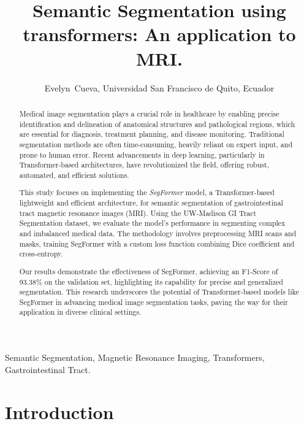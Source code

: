\documentclass[journal]{IEEEtran}
\author{}
\date{}
\begin{document}
\title{Semantic Segmentation using transformers: An application to MRI.}
\author{Evelyn~Cueva, Universidad San Francisco de Quito, Ecuador}
\newpage
\twocolumn

\fontsize{10}{12}\selectfont

\maketitle

\begin{abstract}
  Medical image segmentation plays a crucial role in healthcare by enabling precise identification and delineation of anatomical structures and pathological regions, which are essential for diagnosis, treatment planning, and disease monitoring. Traditional segmentation methods are often time-consuming, heavily reliant on expert input, and prone to human error. Recent advancements in deep learning, particularly in Transformer-based architectures, have revolutionized the field, offering robust, automated, and efficient solutions. 
  
  This study focuses on implementing the \emph{SegFormer} model, a Transformer-based lightweight and efficient architecture, for semantic segmentation of gastrointestinal tract magnetic resonance images (MRI). Using the UW-Madison GI Tract Segmentation dataset, we evaluate the model's performance in segmenting complex and imbalanced medical data. The methodology involves preprocessing MRI scans and masks, training SegFormer with a custom loss function combining Dice coefficient and cross-entropy. 
  
  Our results demonstrate the effectiveness of SegFormer, achieving an F1-Score of 93.38\% on the validation set, highlighting its capability for precise and generalized segmentation. This research underscores the potential of Transformer-based models like SegFormer in advancing medical image segmentation tasks, paving the way for their application in diverse clinical settings.
\end{abstract}

\begin{IEEEkeywords}
Semantic Segmentation, Magnetic Resonance Imaging, Transformers, Gastrointestinal Tract.
\end{IEEEkeywords}

 \IEEEpeerreviewmaketitle


\section{Introduction}
\end{document}
